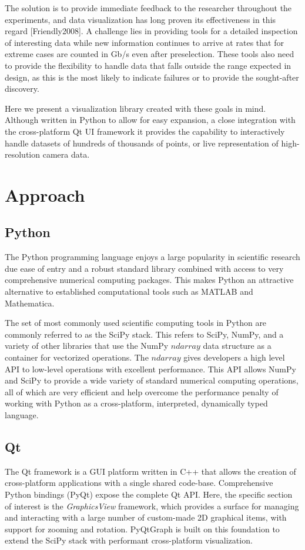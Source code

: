 \documentclass[journal]{vgtc}                %
\begin{document}
The solution is to provide immediate feedback to the researcher throughout the experiments, and data visualization has long proven its effectiveness in this regard [Friendly2008]. A challenge lies in providing tools for a detailed inspection of interesting data while new information continues to arrive at rates that for extreme cases are counted in Gb/s even after preselection\cite{LHC}. These tools also need to provide the flexibility to handle data that falls outside the range expected in design, as this is the most likely to indicate failures or to provide the sought-after discovery.

Here we present a visualization library created with these goals in mind. Although written in Python to allow for easy expansion, a close integration with the cross-platform Qt UI framework\cite{Qt} it provides the capability to interactively handle datasets of hundreds of thousands of points, or live representation of high-resolution camera data.


\section{Approach}
\subsection{Python}
The Python programming language enjoys a large popularity in scientific research due ease of entry and a robust standard library combined with access to very comprehensive numerical computing packages. This makes Python an attractive alternative to established computational tools such as MATLAB\cite{matlab} and Mathematica. %

The set of most commonly used scientific computing tools in Python are commonly referred to as the SciPy stack. %
This refers to SciPy, NumPy, and a variety of other libraries that use the NumPy \emph{$ndarray$} data structure as a container for vectorized operations. The $ndarray$ gives developers a high level API to low-level operations with excellent performance. This API allows NumPy and SciPy to provide a wide variety of standard numerical computing operations, all of which are very efficient and help overcome the performance penalty of working with Python as a cross-platform, interpreted, dynamically typed language.

\subsection{Qt}
The Qt framework is a GUI platform written in C++ that allows the creation of cross-platform applications with a single shared code-base. Comprehensive Python bindings (PyQt) expose the complete Qt API. Here, the specific section of interest is the \emph{GraphicsView} framework, which provides a surface for managing and interacting with a large number of custom-made 2D graphical items, with support for zooming and rotation\cite{QtGraphicsView}. PyQtGraph is built on this foundation to extend the SciPy stack with performant cross-platform visualization.
\end{document}
